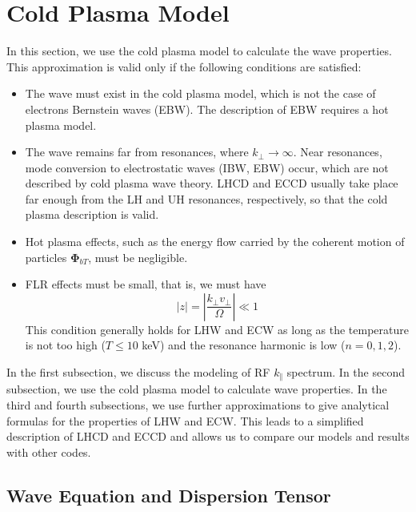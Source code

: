 
\label{cold}\section{Cold Plasma Model} In this section, we use the
cold plasma model to calculate the wave properties. This
approximation is valid only if the following conditions are
satisfied:

\begin{itemize}
\item  The wave must exist in the cold plasma model, which is not the case of
electrons Bernstein waves (EBW). The description of EBW requires a hot plasma model.

\item  The wave remains far from resonances, where $k_{\bot}\rightarrow\infty
$. Near resonances, mode conversion to electrostatic waves (IBW, EBW) occur,
which are not described by cold plasma wave theory. LHCD and ECCD usually take
place far enough from the LH and UH resonances, respectively, so that the cold
plasma description is valid.

\item  Hot plasma effects, such as the energy flow carried by the coherent
motion of particles $\mathbf{\Phi}_{bT}$, must be negligible.

\item  FLR effects must be small, that is, we must have%
\begin{equation}
\left|  z\right|  =\left|  \frac{k_{\perp}v_{\perp}}{\Omega}\right|  \ll1
\end{equation}
This condition generally holds for LHW and ECW as long as the temperature is
not too high ($T\leq10$ keV) and the resonance harmonic is low ($n=0,1,2$).
\end{itemize}

In the first subsection, we discuss the modeling of RF $k_{\Vert}$ spectrum.
In the second subsection, we use the cold plasma model to calculate wave
properties. In the third and fourth subsections, we use further approximations
to give analytical formulas for the properties of LHW and ECW. This leads to a
simplified description of LHCD and ECCD and allows us to compare our models
and results with other codes.

\subsection{Wave Equation and Dispersion Tensor}

